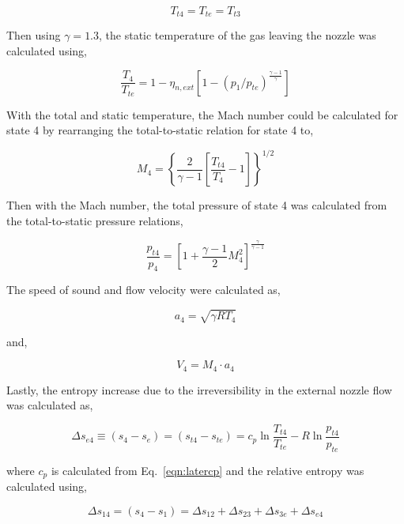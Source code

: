 \documentclass[conf]{new-aiaa} %
\begin{document}
\begin{equation}
    \label{eqn:Tt4}
    T_{t4}=T_{te}=T_{t3}
\end{equation}

Then using $\gamma=1.3$, the static temperature of the gas leaving the nozzle was calculated using,

\begin{equation}
    \label{eqn:T4}
    \frac{T_4}{T_{te}}=1-\eta_{n,ext}\left[1-\left(p_1/p_{te}\right)^\frac{\gamma-1}{\gamma}\right]
\end{equation}

With the total and static temperature, the Mach number could be calculated for state 4 by rearranging the total-to-static relation for state 4 to,

\begin{equation}
    \label{eqn:M4}
    M_4=\left\{\frac{2}{\gamma-1}\left[\frac{T_{t4}}{T_4}-1\right]\right\}^{1/2}
\end{equation}

Then with the Mach number, the total pressure of state 4 was calculated from the total-to-static pressure relations,

\begin{equation}
    \label{eqn:pt4}
    \frac{p_{t4}}{p_4}=\left[1+\frac{\gamma-1}{2}M_4^2\right]^\frac{\gamma}{\gamma-1}
\end{equation}

The speed of sound and flow velocity were calculated as,

\begin{equation}
    \label{eqn:a4}
    a_4=\sqrt{\gamma R T_4}
\end{equation}

and,

\begin{equation}
    \label{eqn:V4}
    V_4=M_4\cdot a_4
\end{equation}

Lastly, the entropy increase due to the irreversibility in the external nozzle flow was calculated as,

\begin{equation}
    \label{eqn:delse4}
    \Delta s_{e4}\equiv(s_4-s_e)=(s_{t4}-s_{te})=c_p \ln\frac{T_{t4}}{T_{te}}-R\ln\frac{p_{t4}}{p_{te}}
\end{equation}

where $c_p$ is calculated from Eq.~\eqref{eqn:latercp} and the relative entropy was calculated using,

\begin{equation}
    \label{eqn:dels14}
    \Delta s_{14}=(s_4-s_1)=\Delta s_{12}+\Delta s_{23}+\Delta s_{3e}+\Delta s_{e4}
\end{equation}
\end{document}
